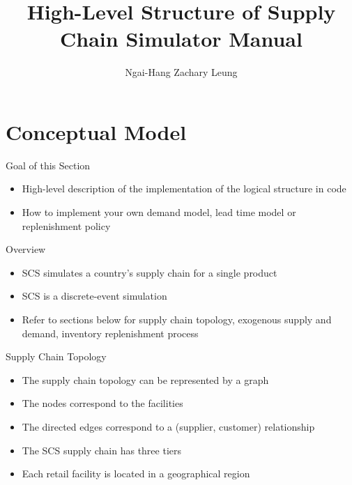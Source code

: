 \documentclass{beamer}
\title{High-Level Structure of Supply Chain Simulator Manual}
\author{Ngai-Hang Zachary Leung}
\begin{document}
\begin{frame}
\maketitle
\end{frame}


\begin{frame}
\tableofcontents
\end{frame}

\section{Conceptual Model}

\begin{frame}{Goal of this Section}
\begin{itemize}
\item
High-level description of the implementation of the logical structure in code
\item
How to implement your own demand model, lead time model or replenishment policy
\end{itemize}
\end{frame}


\begin{frame}{Overview}
\begin{itemize}
\item SCS simulates a country's supply chain for a single product
\item SCS is a discrete-event simulation
\item Refer to sections below for supply chain topology,
exogenous supply and demand,
inventory replenishment process
\end{itemize}
\end{frame}

\begin{frame}{Supply Chain Topology}
\begin{itemize}
\item The supply chain topology can be represented by a graph
\item The nodes correspond to the facilities
\item The directed edges correspond to a (supplier, customer) relationship
\item The SCS supply chain has three tiers
\item Each retail facility is located in a geographical region
\end{itemize}
\end{frame}
\end{document}
